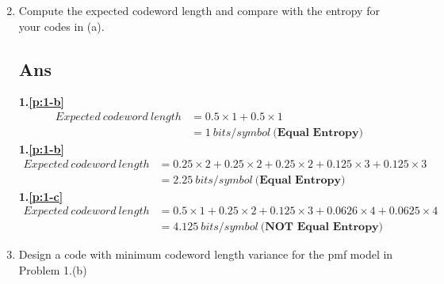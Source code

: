 \documentclass[a4paper, 11pt]{article}
\begin{document}
\begin{enumerate}[label=(\alph*)]
\begin{multicols}{2}
        \null \vfill
  \end{multicols}
  \vspace{2em}
  \item Compute the expected codeword length and compare with the entropy for your codes in (a).
  \subsection*{Ans}
  \textbf{1.\ref{p:1-b}}
  \begin{align*}
    Expected~codeword~length&=0.5 \times 1 + 0.5 \times 1 \\
                            &=1 ~bits/symbol~\textbf{(Equal Entropy)}
  \end{align*}
  \textbf{1.\ref{p:1-b}}
  \begin{align*}
    Expected~codeword~length&=0.25 \times 2 + 0.25 \times 2 + 0.25 \times 2 + 
                              0.125 \times 3 + 0.125 \times 3 \\
                            &=2.25 ~bits/symbol~\textbf{(Equal Entropy)}
  \end{align*}
  \textbf{1.\ref{p:1-c}}
  \begin{align*}
    Expected~codeword~length&=0.5 \times 1 + 0.25 \times 2 + 0.125 \times 3 + 
                              0.0626 \times 4 + 0.0625 \times 4 \\
                            &=4.125 ~bits/symbol~\textbf{(NOT Equal Entropy)}
  \end{align*}
  \newpage
  \item Design a code with minimum codeword length variance for the pmf model in Problem 1.(b)

\end{enumerate}
\end{document}
